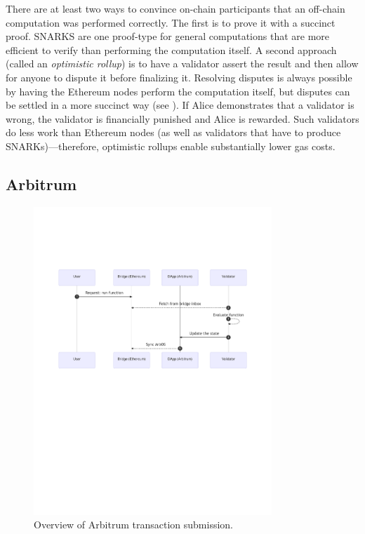 There are at least two ways to convince on-chain participants that an off-chain computation was performed correctly. The first is to prove it with a succinct proof. SNARKS are one proof-type for general computations that are more efficient to verify than performing the computation itself. A second approach (called an \emph{optimistic rollup}) is to have a validator assert the result and then allow for anyone to dispute it before finalizing it. Resolving disputes is always possible by having the Ethereum nodes perform the computation itself, but disputes can be settled in a more succinct way (see \cite{KGCWF18}). If Alice demonstrates that a validator is wrong, the validator is financially punished and Alice is rewarded. Such validators do less work than Ethereum nodes (as well as validators that have to produce SNARKs)---therefore, optimistic rollups enable substantially lower gas costs.

\subsection{Arbitrum}

\begin{figure}[t]
	\centering
	\includegraphics[width=0.8\textwidth]{figures/arbitrum.pdf}
	\caption{Overview of Arbitrum transaction submission.}
	\label{fig:arbsys}
\end{figure}

